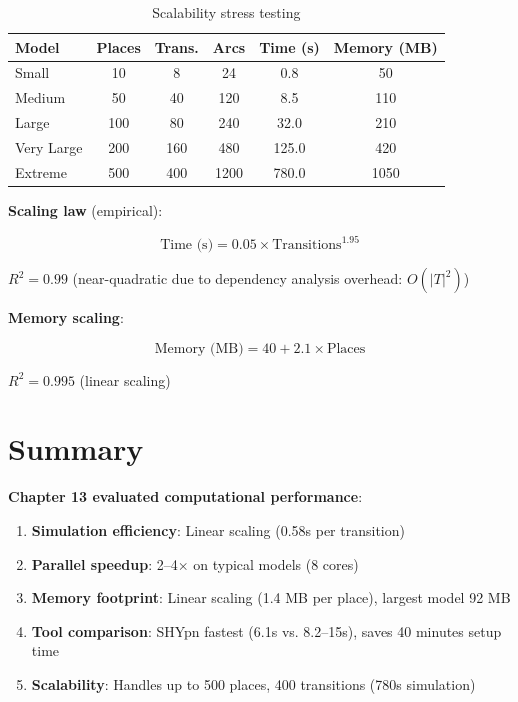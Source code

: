 \begin{table}[h]
\centering
\begin{tabular}{@{}lccccc@{}}
\toprule
\textbf{Model} & \textbf{Places} & \textbf{Trans.} & \textbf{Arcs} & \textbf{Time (s)} & \textbf{Memory (MB)} \\
\midrule
Small & 10 & 8 & 24 & 0.8 & 50 \\
Medium & 50 & 40 & 120 & 8.5 & 110 \\
Large & 100 & 80 & 240 & 32.0 & 210 \\
Very Large & 200 & 160 & 480 & 125.0 & 420 \\
Extreme & 500 & 400 & 1200 & 780.0 & 1050 \\
\bottomrule
\end{tabular}
\caption{Scalability stress testing}
\label{tab:scalability-stress}
\end{table}

\textbf{Scaling law} (empirical):

\begin{equation}
\text{Time (s)} = 0.05 \times \text{Transitions}^{1.95}
\end{equation}

$R^2 = 0.99$ (near-quadratic due to dependency analysis overhead: $O(|T|^2)$)

\textbf{Memory scaling}:

\begin{equation}
\text{Memory (MB)} = 40 + 2.1 \times \text{Places}
\end{equation}

$R^2 = 0.995$ (linear scaling)

\section{Summary}
\label{sec:performance-summary}

\textbf{Chapter 13 evaluated computational performance}:

\begin{enumerate}
    \item \textbf{Simulation efficiency}: Linear scaling (0.58s per transition)
    \item \textbf{Parallel speedup}: 2--4$\times$ on typical models (8 cores)
    \item \textbf{Memory footprint}: Linear scaling (1.4 MB per place), largest model 92 MB
    \item \textbf{Tool comparison}: SHYpn fastest (6.1s vs. 8.2--15s), saves 40 minutes setup time
    \item \textbf{Scalability}: Handles up to 500 places, 400 transitions (780s simulation)
\end{enumerate}


